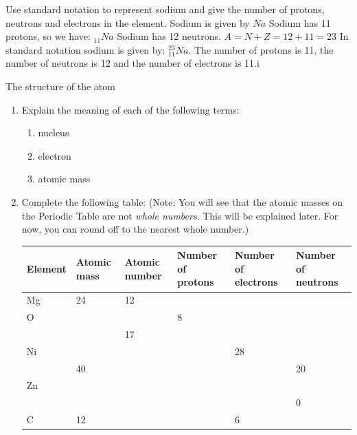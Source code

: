 \begin{wex}
{%
}
{%
Use standard notation to represent sodium and give the number of protons, neutrons and electrons in the element.
}
{%
\westep{} Sodium is given by $Na$
\westep{} Sodium has 11 protons, so we have: ${}_{11}Na$
\westep{} Sodium has 12 neutrons.
\westep{} $A=N+Z=12+11=23$
\westep{} In standard notation sodium is given by: $_{11}^{23}Na$. The number of protons is 11, the number of neutrons is 12 and the number of electrons is 11.i
}    
\end{wex}
    

\begin{exercises}{The structure of the atom}
      \label{m38745*id256225}\begin{enumerate}[noitemsep, label=\textbf{\arabic*}. ] 
            \label{m38745*uid15}\item Explain the meaning of each of the following terms:
\label{m38745*id256240}\begin{enumerate}[noitemsep, label=\textbf{\alph*}. ] 
            \label{m38745*uid16}\item nucleus
\label{m38745*uid17}\item electron
\label{m38745*uid18}\item atomic mass
\end{enumerate}
                \label{m38745*uid19}\item Complete the following table: (Note: You will see that the atomic masses on the Periodic Table are not \textsl{whole numbers}. This will be explained later. For now, you can round off to the nearest whole number.)
\begin{center} 
\begin{tabular}{|p{1.4cm}|p{1.4cm}|p{1.4cm}|p{1.4cm}|p{1.4cm}|p{1.4cm}|}\hline
\textbf{Element} & \textbf{Atomic mass} & \textbf{Atomic number} & \textbf{Number of protons} & \textbf{Number of electrons} & \textbf{Number of neutrons}\\\hline
Mg & 24 & 12 & & & \\\hline
O & & & 8 & & \\\hline
 & & 17 & & & \\\hline
Ni & & & & 28 & \\\hline
 & 40 & & & & 20 \\\hline
Zn & & & & & \\\hline
 & & & & & 0 \\\hline
C & 12 & & & 6 & \\\hline 

\end{tabular}
\end{center}
\end{enumerate}
\end{exercises}
